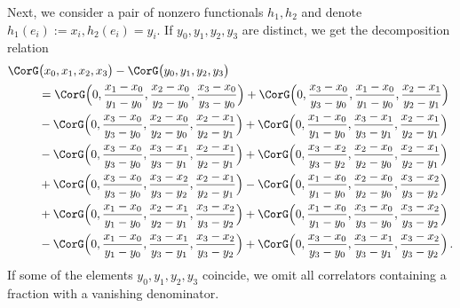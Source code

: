 \documentclass[a4paper]{amsart}
\begin{document}
Next, we consider a pair of nonzero functionals $h_1, h_2$ and denote $h_1(e_i):=x_i, h_2(e_i)=y_i$. If $y_0, y_1, y_2, y_3$ are distinct, we get the decomposition relation
\begin{align*}
\CorG&\bigl(x_0,x_1 ,x_2 , x_3\bigr)-\CorG\bigl(y_0, y_1, y_2, y_3\bigr)\\
&=\CorG\Bigl(0,\frac{x_1-x_0}{y_1-y_0} ,\frac{x_2-x_0}{y_2-y_0} , \frac{x_3-x_0}{y_3-y_0}\Bigr)
+\CorG\Bigl(0,\frac{x_3-x_0}{y_3-y_0}, \frac{x_1-x_0}{y_1-y_0},\frac{x_2-x_1}{y_2-y_1}\Bigr)\\
&-\CorG\Bigl(0,\frac{x_3-x_0}{y_3-y_0}, \frac{x_2-x_0}{y_2-y_0}, \frac{x_2-x_1}{y_2-y_1}\Bigr)
+\CorG\Bigl(0,\frac{x_1-x_0}{y_1-y_0} , \frac{x_3-x_1}{y_3-y_1} , \frac{x_2-x_1}{y_2-y_1}\Bigr)\\
&-\CorG\Bigl(0,\frac{x_3-x_0}{y_3-y_0} , \frac{x_3-x_1}{y_3-y_1} , \frac{x_2-x_1}{y_2-y_1}\Bigr)
+\CorG\Bigl(0,\frac{x_3-x_2}{y_3-y_2},\frac{x_2-x_0}{y_2-y_0}, \frac{x_2-x_1}{y_2-y_1}\Bigr)\\
&+\CorG\Bigl(0,\frac{x_3-x_0}{y_3-y_0} , \frac{x_3-x_2}{y_3-y_2} , \frac{x_2-x_1}{y_2-y_1}\Bigr)
-\CorG\Bigl(0,\frac{x_1-x_0}{y_1-y_0} ,\frac{x_2-x_0}{y_2-y_0} , \frac{x_3-x_2}{y_3-y_2}\Bigr)\\
&+\CorG\Bigl(0,\frac{x_1-x_0}{y_1-y_0} , \frac{x_2-x_1}{y_2-y_1} , \frac{x_3-x_2}{y_3-y_2}\Bigr)
 +\CorG\Bigl(0,\frac{x_1-x_0}{y_1-y_0} , \frac{x_3-x_0}{y_3-y_0} , \frac{x_3-x_2}{y_3-y_2}\Bigr)\\
&-\CorG\Bigl(0,\frac{x_1-x_0}{y_1-y_0} , \frac{x_3-x_1}{y_3-y_1} , \frac{x_3-x_2}{y_3-y_2}\Bigr)
 +\CorG\Bigl(0,\frac{x_3-x_0}{y_3-y_0} , \frac{x_3-x_1}{y_3-y_1} , \frac{x_3-x_2}{y_3-y_2}\Bigr)\,.
\end{align*}
If some of the elements $y_0, y_1, y_2, y_3$ coincide, we omit all correlators containing a fraction with a vanishing denominator.  
\end{document}

